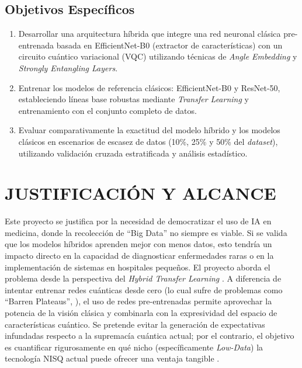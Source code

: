 \documentclass[12pt,letterpaper]{article}
\begin{document}
    \subsection{Objetivos Específicos}
    \vspace{-0.5cm}
    \begin{enumerate}
        \item Desarrollar una arquitectura híbrida que integre una red neuronal clásica pre-entrenada basada en EfficientNet-B0 (extractor de características) con un circuito cuántico variacional (VQC) utilizando técnicas de \textit{Angle Embedding} y \textit{Strongly Entangling Layers}.
        \item Entrenar los modelos de referencia clásicos: EfficientNet-B0 y ResNet-50, estableciendo líneas base robustas mediante \textit{Transfer Learning} y entrenamiento con el conjunto completo de datos.        
        \item Evaluar comparativamente la exactitud del modelo híbrido y los modelos clásicos en escenarios de escasez de datos (10\%, 25\% y 50\% del \textit{dataset}), utilizando validación cruzada estratificada y análisis estadístico.
        
    \end{enumerate}

    \newpage
    \section{JUSTIFICACIÓN Y ALCANCE}
    \vspace{-0.5cm}

    Este proyecto se justifica por la necesidad de democratizar el uso de IA en medicina, donde la recolección de ``Big Data'' no siempre es viable.
    Si se valida que los modelos híbridos aprenden mejor con menos datos, esto tendría un impacto directo en la capacidad de diagnosticar enfermedades raras o en la implementación de sistemas en hospitales pequeños.
   El proyecto aborda el problema desde la perspectiva del \textit{Hybrid Transfer Learning} \citep{mari2020transfer}.
    A diferencia de intentar entrenar redes cuánticas desde cero (lo cual sufre de problemas como ``Barren Plateaus'', \citet{McClean2018B}), el uso de redes pre-entrenadas permite aprovechar la potencia de la visión clásica y combinarla con la expresividad del espacio de características cuántico.
    Se pretende evitar la generación de expectativas infundadas respecto a la supremacía cuántica actual; por el contrario, el objetivo es cuantificar rigurosamente en qué nicho (específicamente \textit{Low-Data}) la tecnología NISQ actual puede ofrecer una ventaja tangible \citep{gupta2025systematic}.
\end{document}
